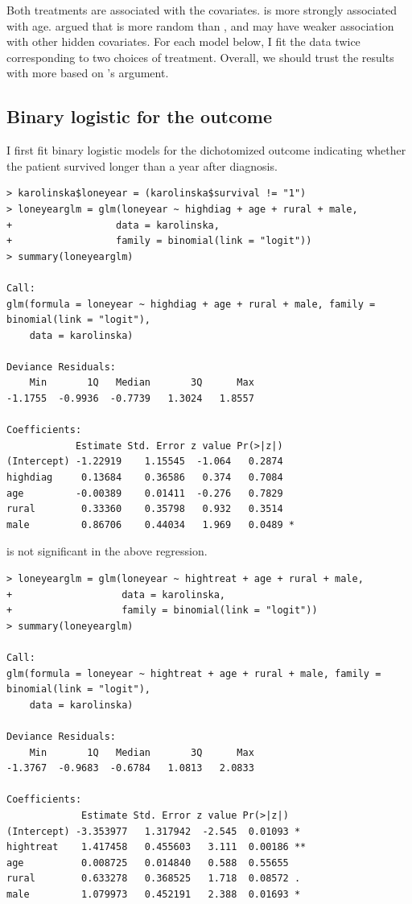 Both treatments are associated with the covariates.  is more strongly associated with age.   \citet{rubin2008objective} argued that  is more random than  , and may have weaker association with other hidden covariates. For each model below, I fit the data twice corresponding to two choices of treatment.  Overall, we should trust the results with  more based on \citet{rubin2008objective}'s argument. 

 

\subsection{Binary logistic for the outcome}


I first fit binary logistic models for the dichotomized outcome indicating whether the patient survived longer than a year after diagnosis. 

\begin{lstlisting}
> karolinska$loneyear = (karolinska$survival != "1")
> loneyearglm = glm(loneyear ~ highdiag + age + rural + male,
+                  data = karolinska, 
+                  family = binomial(link = "logit"))
> summary(loneyearglm)

Call:
glm(formula = loneyear ~ highdiag + age + rural + male, family = binomial(link = "logit"), 
    data = karolinska)

Deviance Residuals: 
    Min       1Q   Median       3Q      Max  
-1.1755  -0.9936  -0.7739   1.3024   1.8557  

Coefficients:
            Estimate Std. Error z value Pr(>|z|)  
(Intercept) -1.22919    1.15545  -1.064   0.2874  
highdiag     0.13684    0.36586   0.374   0.7084  
age         -0.00389    0.01411  -0.276   0.7829  
rural        0.33360    0.35798   0.932   0.3514  
male         0.86706    0.44034   1.969   0.0489 *
\end{lstlisting}

 is not significant in the above regression. 


\begin{lstlisting}
> loneyearglm = glm(loneyear ~ hightreat + age + rural + male, 
+                   data = karolinska, 
+                   family = binomial(link = "logit"))
> summary(loneyearglm)

Call:
glm(formula = loneyear ~ hightreat + age + rural + male, family = binomial(link = "logit"), 
    data = karolinska)

Deviance Residuals: 
    Min       1Q   Median       3Q      Max  
-1.3767  -0.9683  -0.6784   1.0813   2.0833  

Coefficients:
             Estimate Std. Error z value Pr(>|z|)   
(Intercept) -3.353977   1.317942  -2.545  0.01093 * 
hightreat    1.417458   0.455603   3.111  0.00186 **
age          0.008725   0.014840   0.588  0.55655   
rural        0.633278   0.368525   1.718  0.08572 . 
male         1.079973   0.452191   2.388  0.01693 * 
\end{lstlisting} 


